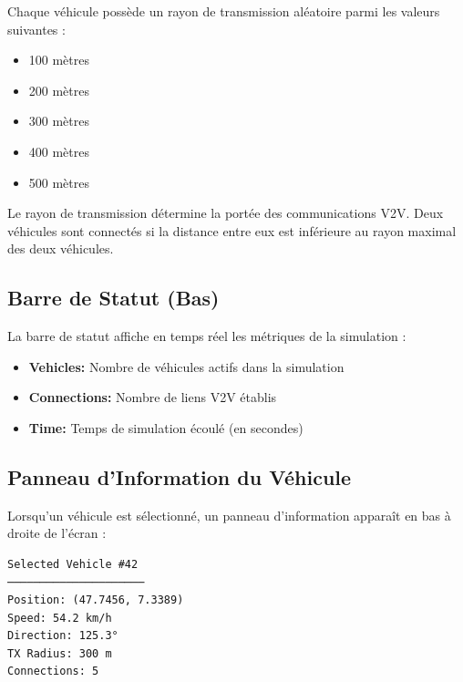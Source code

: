 \documentclass[12pt,a4paper]{article}
\begin{document}
Chaque véhicule possède un rayon de transmission aléatoire parmi les valeurs suivantes :

\begin{itemize}
    \item 100 mètres
    \item 200 mètres
    \item 300 mètres
    \item 400 mètres
    \item 500 mètres
\end{itemize}

\begin{tipbox}
Le rayon de transmission détermine la portée des communications V2V. Deux véhicules sont connectés si la distance entre eux est inférieure au rayon maximal des deux véhicules.
\end{tipbox}

\subsection{Barre de Statut (Bas)}

La barre de statut affiche en temps réel les métriques de la simulation :

\begin{itemize}
    \item \textbf{Vehicles:} Nombre de véhicules actifs dans la simulation
    \item \textbf{Connections:} Nombre de liens V2V établis
    \item \textbf{Time:} Temps de simulation écoulé (en secondes)
\end{itemize}

\subsection{Panneau d'Information du Véhicule}

Lorsqu'un véhicule est sélectionné, un panneau d'information apparaît en bas à droite de l'écran :

\begin{tcolorbox}[colback=white, colframe=gray, width=0.5\textwidth]
\begin{verbatim}
Selected Vehicle #42
─────────────────────
Position: (47.7456, 7.3389)
Speed: 54.2 km/h
Direction: 125.3°
TX Radius: 300 m
Connections: 5
\end{verbatim}
\end{tcolorbox}

\end{document}
